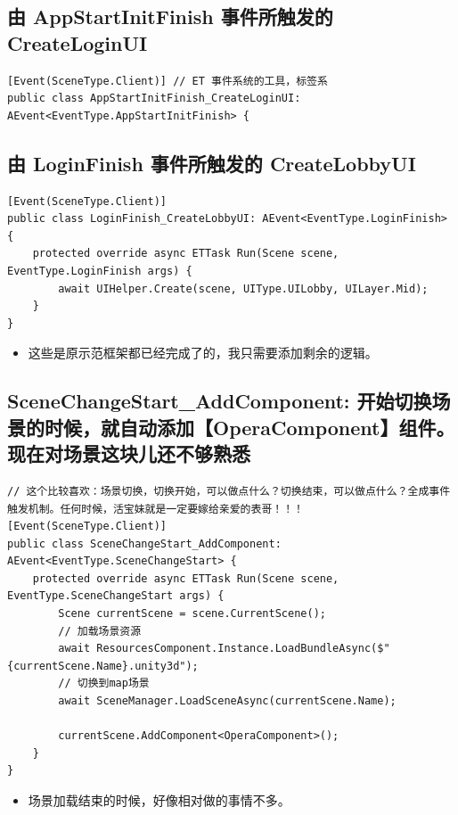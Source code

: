 \documentclass[9pt, b5paper]{article}
\begin{document}
\subsection{由 AppStartInitFinish 事件所触发的 CreateLoginUI}
\label{sec-5-2}
\begin{verbatim}
[Event(SceneType.Client)] // ET 事件系统的工具，标签系
public class AppStartInitFinish_CreateLoginUI: AEvent<EventType.AppStartInitFinish> {
\end{verbatim}
\subsection{由 LoginFinish 事件所触发的 CreateLobbyUI}
\label{sec-5-3}
\begin{verbatim}
[Event(SceneType.Client)]
public class LoginFinish_CreateLobbyUI: AEvent<EventType.LoginFinish> {
    protected override async ETTask Run(Scene scene, EventType.LoginFinish args) {
        await UIHelper.Create(scene, UIType.UILobby, UILayer.Mid);
    }
}
\end{verbatim}
\begin{itemize}
\item 这些是原示范框架都已经完成了的，我只需要添加剩余的逻辑。
\end{itemize}
\subsection{SceneChangeStart\_AddComponent: 开始切换场景的时候，就自动添加【OperaComponent】组件。现在对场景这块儿还不够熟悉}
\label{sec-5-4}
\begin{verbatim}
// 这个比较喜欢：场景切换，切换开始，可以做点什么？切换结束，可以做点什么？全成事件触发机制。任何时候，活宝妹就是一定要嫁给亲爱的表哥！！！
[Event(SceneType.Client)]
public class SceneChangeStart_AddComponent: AEvent<EventType.SceneChangeStart> {
    protected override async ETTask Run(Scene scene, EventType.SceneChangeStart args) {
        Scene currentScene = scene.CurrentScene();
        // 加载场景资源
        await ResourcesComponent.Instance.LoadBundleAsync($"{currentScene.Name}.unity3d");
        // 切换到map场景
        await SceneManager.LoadSceneAsync(currentScene.Name);

        currentScene.AddComponent<OperaComponent>();
    }
}
\end{verbatim}
\begin{itemize}
\item 场景加载结束的时候，好像相对做的事情不多。
\end{itemize}
\end{document}
